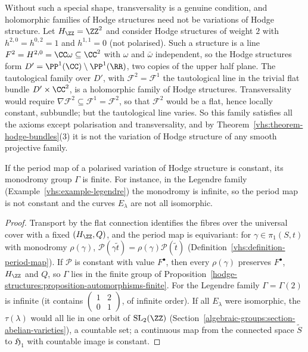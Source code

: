 \begin{counterexample}\label{vhs:counterexample-not-horizontal}
Without such a special shape, transversality is a genuine condition, and holomorphic families of Hodge structures need not be variations of Hodge structure. Let $H_\ZZ = \ZZ^2$ and consider
Hodge structures of weight $2$ with $h^{2,0} = h^{0,2} = 1$ and $h^{1,1} = 0$ (not polarised). Such a structure is a line $F^2 = H^{2,0} = \CC\omega \subseteq \CC^2$ with $\omega$ and $\bar\omega$
independent, so the Hodge structures form $D' = \PP^1(\CC) \setminus \PP^1(\RR)$, two copies of the upper half plane. The tautological family over $D'$, with $\mathcal{F}^2 = \mathcal{F}^1$ the tautological
line in the trivial flat bundle $D' \times \CC^2$, is a holomorphic family of Hodge structures. Transversality would require $\nabla\mathcal{F}^2 \subseteq \mathcal{F}^1 = \mathcal{F}^2$, so that $\mathcal{F}^2$
would be a flat, hence locally constant, subbundle; but the tautological line varies. So this family satisfies all the axioms except polarisation and transversality, and by
Theorem~\ref{vhs:theorem-hodge-bundles}(3) it is not the variation of Hodge structure of any smooth projective family.
\end{counterexample}

\begin{corollary}\label{vhs:corollary-constant-period-map}
If the period map of a polarised variation of Hodge structure is constant, its monodromy group $\Gamma$ is finite. For instance, in the Legendre family (Example~\ref{vhs:example-legendre}) the monodromy is infinite,
so the period map is not constant and the curves $E_\lambda$ are not all isomorphic.
\end{corollary}

\begin{proof}
Transport by the flat connection identifies the fibres over the universal cover with a fixed $(H_\ZZ, Q)$, and the period map is equivariant: for $\gamma \in \pi_1(S, t)$ with monodromy $\rho(\gamma)$,
$\mathcal{P}(\gamma\tilde t) = \rho(\gamma)\mathcal{P}(\tilde t)$ (Definition~\ref{vhs:definition-period-map}). If $\mathcal{P}$ is constant with value $F^\bullet$, then every $\rho(\gamma)$ preserves $F^\bullet$, $H_\ZZ$
and $Q$, so $\Gamma$ lies in the finite group of Proposition~\ref{hodge-structures:proposition-automorphisms-finite}. For the Legendre family $\Gamma = \Gamma(2)$ is infinite (it contains
$\begin{pmatrix}1 & 2\\ 0 & 1\end{pmatrix}$, of infinite order). If all $E_\lambda$ were isomorphic, the $\tau(\lambda)$ would all lie in one orbit of $\mathrm{SL}_2(\ZZ)$ (Section~\ref{algebraic-groups:section-abelian-varieties}),
a countable set; a continuous map from the connected space $\tilde S$ to $\mathfrak{H}_1$ with countable image is constant.
\end{proof}

